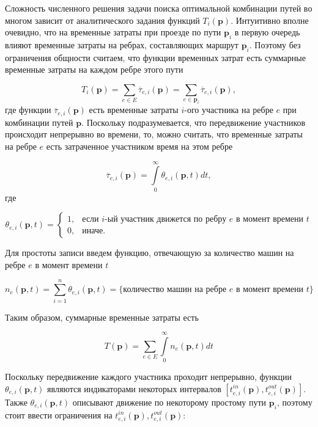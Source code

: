 \documentclass[12pt, a4paper]{article}
\begin{document}
Сложность численного решения задачи поиска оптимальной комбинации путей во многом зависит от аналитического задания функций
$T_i (\textbf{p})$. Интуитивно вполне очевидно, что на временные затраты при проезде по пути $\textbf{p}_i$ в первую очередь влияют временные затраты на ребрах, составляющих маршрут $\textbf{p}_i$. Поэтому без ограничения общности считаем, что функции временных затрат есть суммарные временные затраты на каждом ребре этого пути

$$T_i (\textbf{p}) = \sum \limits_{e \in E} \overline{\tau}_{e, i} (\textbf{p}) = \sum \limits_{e \in \textbf{p}_i} \overline{\tau}_{e, i} (\textbf{p}), $$
где функции $\overline{\tau}_{e, i} (\textbf{p})$ есть временные затраты $i$-ого участника на ребре $e$ при комбинации путей $\textbf{p}$. Поскольку подразумевается, что передвижение участников происходит непрерывно во времени, то, можно считать, что временные затраты на ребре $e$ есть затраченное участником время на этом ребре

$$  \overline{\tau}_{e, i} (\textbf{p}) = \int\limits_{0}^{\infty} \theta_{e, i} (\textbf{p}, t) dt, $$
где 

$$
\theta_{e, i} (\textbf{p}, t) =
\begin{cases}
	1, & \text{если }  i\text{-ый участник движется по ребру $e$ в момент времени $t$}  \\
	0, & \text{иначе}.
\end{cases}
$$

Для простоты записи введем функцию, отвечающую за количество машин на ребре $e$ в момент времени $t$

$$n_e(\textbf{p}, t) = \sum \limits_{i = 1}^n \theta_{e, i} (\textbf{p}, t) = \{\text{количество машин на ребре } e \text { в момент времени } t\}$$

Таким образом, суммарные временные затраты есть 

\begin{equation}
\label{eq:target_func_n_e}
T(\textbf{p}) = \sum \limits_{e \in E} \int\limits_{0}^{\infty} n_e (\textbf{p}, t) dt
\end{equation}

Поскольку передвижение каждого участника проходит непрерывно, функции $\theta_{e, i} (\textbf{p}, t)$ являются индикаторами некоторых интервалов $[t_{e, i}^{in} (\textbf{p}), t_{e, i}^{out} (\textbf{p})]$. Также $\theta_{e, i} (\textbf{p}, t)$ описывают движение по некоторому простому пути $\textbf{p}_i$, поэтому стоит ввести ограничения на $t_{e, i}^{in} (\textbf{p}), t_{e, i}^{out} (\textbf{p})$:
\end{document}
